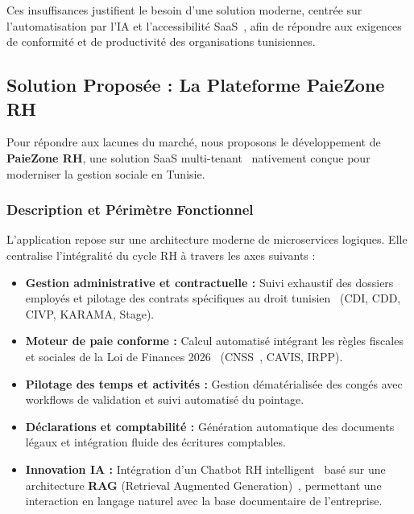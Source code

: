 \vspace{0.3cm}

\noindent Ces insuffisances justifient le besoin d'une solution moderne, centrée sur l'automatisation par l'IA et l'accessibilité SaaS~\cite{saas}, afin de répondre aux exigences de conformité et de productivité des organisations tunisiennes.

\subsection{Solution Proposée : La Plateforme PaieZone RH}\label{sec:solution}

Pour répondre aux lacunes du marché, nous proposons le développement de \textbf{PaieZone RH}, une solution SaaS multi-tenant~\cite{multitenant} nativement conçue pour moderniser la gestion sociale en Tunisie.

\subsubsection{Description et Périmètre Fonctionnel}
L'application repose sur une architecture moderne de microservices logiques. Elle centralise l'intégralité du cycle RH à travers les axes suivants :
\begingroup
\begin{itemize}[label=\textbullet, leftmargin=1.5cm]
    \item \textbf{Gestion administrative et contractuelle :} Suivi exhaustif des dossiers employés et pilotage des contrats spécifiques au droit tunisien~\cite{cdt} (CDI, CDD, CIVP, KARAMA, Stage).
    \item \textbf{Moteur de paie conforme :} Calcul automatisé intégrant les règles fiscales et sociales de la Loi de Finances 2026~\cite{loifinance} (CNSS~\cite{cnss_reg}, CAVIS, IRPP).
    \item \textbf{Pilotage des temps et activités :} Gestion dématérialisée des congés avec workflows de validation et suivi automatisé du pointage.
    \item \textbf{Déclarations et comptabilité :} Génération automatique des documents légaux et intégration fluide des écritures comptables.
    \item \textbf{Innovation IA :} Intégration d'un Chatbot RH intelligent~\cite{chatbot_hr} basé sur une architecture \textbf{RAG} (Retrieval Augmented Generation)~\cite{rag_paper}, permettant une interaction en langage naturel avec la base documentaire de l'entreprise.
\end{itemize}
\endgroup
